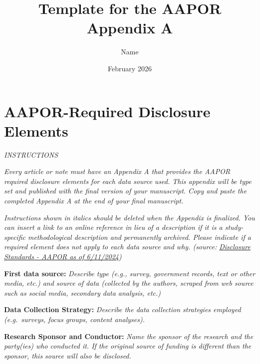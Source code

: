 \documentclass{article}
\title{Template for the AAPOR Appendix A}
\author{Name}
\date{February 2026}
\begin{document}
\maketitle



\renewcommand{\thesection}{\Alph{section}} 

\appendix

\section{AAPOR-Required Disclosure Elements}  


\begin{center}
  \textit{INSTRUCTIONS}  
\end{center}

\textit{Every article or note must have an Appendix A that provides the AAPOR required disclosure elements for each data source used. This appendix will be type set and published with the final version of your manuscript. Copy and paste the completed Appendix A at the end of your final manuscript.}

\textit{Instructions shown in italics should be deleted when the Appendix is finalized. You can insert a link to an online reference in lieu of a description if it is a study-specific methodological description and permanently archived. Please indicate if a required element does not apply to each data source and why. (source: \href{https://aapor.org/standards-and-ethics/disclosure-standards}{Disclosure Standards - AAPOR as of 6/11/2024}) 
}

\medskip
\textbf{First data source:} \textit{Describe type (e.g., survey, government records, text or other media, etc.) and source of data (collected by the authors, scraped from web source such as social media, secondary data analysis, etc.)}

\medskip

\textbf{Data Collection Strategy:} \textit{Describe the data collection strategies employed (e.g.\ surveys, focus groups, content analyses).}

\medskip

\textbf{Research Sponsor and Conductor:} \textit{Name the sponsor of the research and the party(ies) who conducted it. If the original source of funding is different than the sponsor, this source will also be disclosed.}
\end{document}
